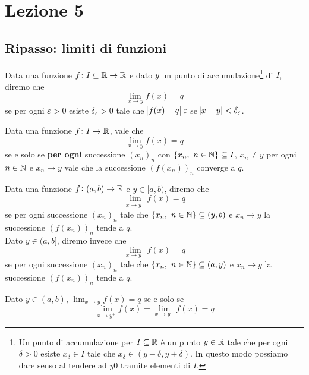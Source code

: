 \section{Lezione 5}
\subsection{Ripasso: limiti di funzioni}
\begin{definition}
    \label{def:5.1}
    Data una funzione $f\colon I\subseteq \amsbb{R}\to\amsbb{R}$ e dato $y$ un punto di accumulazione\footnote{Un punto di accumulazione per $I\subseteq \amsbb{R}$ è un punto $y\in\amsbb{R}$ tale che per ogni $\delta>0$ esiste $x_\delta\in I$ tale che $x_\delta \in (y-\delta, y+ \delta)$. In questo modo possiamo dare senso al tendere ad $y0$ tramite elementi di $I$.} di $I$, diremo che
    \[
    \lim_{x\to y}f(x) = q
    \]
    se per ogni $\varepsilon>0$ esiste $\delta_\varepsilon>0$ tale che $\abs{f(x)-q}\varepsilon$ se $\abs{x-y}<\delta_{\varepsilon}$.
\end{definition}
\begin{theorem}
    \label{th:5.1}
    Data una funzione $f\colon I \to\amsbb{R}$, vale che
    \[
    \lim_{x\to y} f(x) = q
    \]
    se e solo se \textbf{per ogni} successione $(x_n)_n$ con $\{x_n, \ n\in\amsbb{N}\}\subseteq I$, $x_n\ne y$ per ogni $n\in\amsbb{N}$ e $x_n \to y$ vale che la successione $(f(x_n))_n$ converge a $q$.
\end{theorem}
\begin{definition}
    \label{def:5.2}
    Data una funzione $f\colon(a,b)\to \amsbb{R}$ e $y\in[a,b)$, diremo che
    \[
    \lim_{x\to y^+} f(x) = q
    \]
    se per ogni successione $(x_n)_n$ tale che $\{x_n, \ n\in\amsbb{N}\}\subseteq (y,b)$ e $x_n \to y$ la successione $(f(x_n))_n $ tende a $q$.\\
    Dato $y\in(a,b]$, diremo invece che
    \[
    \lim_{x\to y^-} f(x) = q
    \]
    se per ogni successione $(x_n)_n$ tale che $\{x_n, \ n\in\amsbb{N}\}\subseteq (a,y)$ e $x_n \to y$ la successione $(f(x_n))_n $ tende a $q$.\\
\end{definition}
\begin{theorem}
    \label{th:5.2}
    Dato $y\in(a,b)$, $\lim_{x\to y} f(x) =q$ se e solo se 
    \[
    \lim_{x\to y^+}f(x) = \lim_{x\to y^-}f(x) = q
    \]
\end{theorem}
